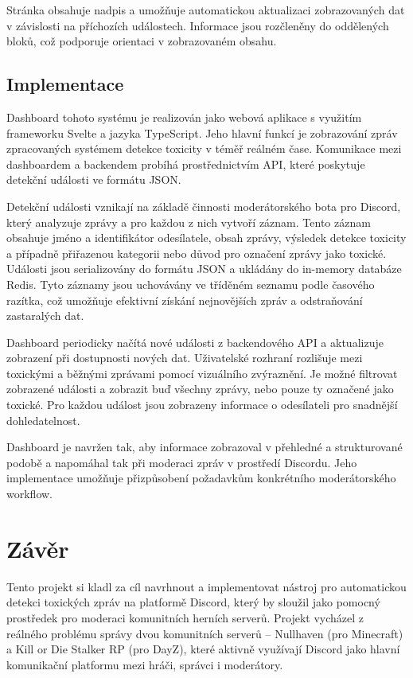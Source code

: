 \documentclass[FM,Proj]{tulthesis}
\begin{document}
Stránka obsahuje nadpis a umožňuje automatickou aktualizaci zobrazovaných dat v závislosti na příchozích událostech. Informace jsou rozčleněny do oddělených bloků, což podporuje orientaci v zobrazovaném obsahu.

\section{Implementace}

Dashboard tohoto systému je realizován jako webová aplikace s využitím frameworku Svelte a jazyka TypeScript. Jeho hlavní funkcí je zobrazování zpráv zpracovaných systémem detekce toxicity v téměř reálném čase. Komunikace mezi dashboardem a backendem probíhá prostřednictvím API, které poskytuje detekční události ve formátu JSON.

Detekční události vznikají na základě činnosti moderátorského bota pro Discord, který analyzuje zprávy a pro každou z nich vytvoří záznam. Tento záznam obsahuje jméno a identifikátor odesílatele, obsah zprávy, výsledek detekce toxicity a případně přiřazenou kategorii nebo důvod pro označení zprávy jako toxické. Události jsou serializovány do formátu JSON a ukládány do in-memory databáze Redis. Tyto záznamy jsou uchovávány ve tříděném seznamu podle časového razítka, což umožňuje efektivní získání nejnovějších zpráv a odstraňování zastaralých dat.

Dashboard periodicky načítá nové události z backendového API a aktualizuje zobrazení při dostupnosti nových dat. Uživatelské rozhraní rozlišuje mezi toxickými a běžnými zprávami pomocí vizuálního zvýraznění. Je možné filtrovat zobrazené události a zobrazit buď všechny zprávy, nebo pouze ty označené jako toxické. Pro každou událost jsou zobrazeny informace o odesílateli pro snadnější dohledatelnost.

Dashboard je navržen tak, aby informace zobrazoval v přehledné a strukturované podobě a napomáhal tak při moderaci zpráv v prostředí Discordu. Jeho implementace umožňuje přizpůsobení požadavkům konkrétního moderátorského workflow.

\chapter*{Závěr}

Tento  projekt si kladl za cíl navrhnout a implementovat nástroj pro automatickou detekci toxických zpráv na platformě Discord, který by sloužil jako pomocný prostředek pro moderaci komunitních herních serverů. Projekt vycházel z reálného problému správy dvou komunitních serverů – Nullhaven (pro Minecraft) a Kill or Die Stalker RP (pro DayZ), které aktivně využívají Discord jako hlavní komunikační platformu mezi hráči, správci i moderátory.
\end{document}
